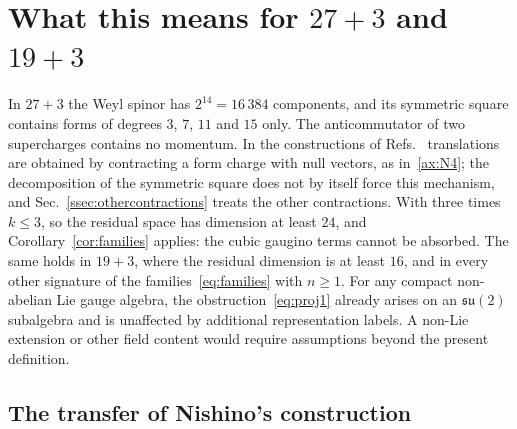 \section{What this means for \texorpdfstring{$27+3$}{27+3} and \texorpdfstring{$19+3$}{19+3}}
\label{sec:consequences}

In $27+3$ the Weyl spinor has $2^{14}=16\,384$ components, and its symmetric square contains forms of degrees $3$, $7$, $11$ and $15$ only. The anticommutator of two supercharges contains no momentum. In the constructions of Refs.~\cite{NishinoSezgin1996,Sezgin1997,Nishino1998} translations are obtained by contracting a form charge with null vectors, as in~\ref{ax:N4}; the decomposition of the symmetric square does not by itself force this mechanism, and Sec.~\ref{ssec:othercontractions} treats the other contractions. With three times $k\le3$, so the residual space has dimension at least $24$, and Corollary~\ref{cor:families} applies: the cubic gaugino terms cannot be absorbed. The same holds in $19+3$, where the residual dimension is at least $16$, and in every other signature of the families~\eqref{eq:families} with $n\ge1$. For any compact non-abelian Lie gauge algebra, the obstruction~\eqref{eq:proj1} already arises on an $\mathfrak{su}(2)$ subalgebra and is unaffected by additional representation labels. A non-Lie extension or other field content would require assumptions beyond the present definition.

\subsection{The transfer of Nishino's construction}
\label{ssec:transfer}

